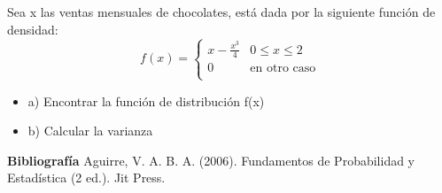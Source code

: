 \documentclass{oxmathproblems}
\begin{document}
\begin{questions}
\miquestion Sea x las ventas mensuales de chocolates, está dada por la siguiente función de densidad: 
\[ 
f(x) = 
     \begin{cases}
       x- \frac{x^3}{4}  & 0  \leq x  \leq 2 \\
       0 & \text{en otro caso} \\
     \end{cases}
\]
$$$$
\begin{itemize}
\item  a) Encontrar la función de distribución f(x)  
\item  b) Calcular la varianza
\end{itemize}


\end{questions}

\textbf{Bibliografía}
Aguirre, V. A. B. A. (2006). Fundamentos de Probabilidad y Estadística (2 ed.). Jit Press.
\end{document}
